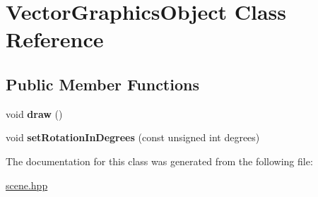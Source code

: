 \hypertarget{class_vector_graphics_object}{}\section{Vector\+Graphics\+Object Class Reference}
\label{class_vector_graphics_object}
\subsection*{Public Member Functions}
\begin{DoxyCompactItemize}
\item 
\mbox{\label{class_vector_graphics_object_a033a9ec046b5a77f478926ce210f9e99}} 
void {\bfseries draw} ()
\item 
\mbox{\label{class_vector_graphics_object_af86c080d8c81da38ea7c91f13211bab9}} 
void {\bfseries set\+Rotation\+In\+Degrees} (const unsigned int degrees)
\end{DoxyCompactItemize}


The documentation for this class was generated from the following file\+:\begin{DoxyCompactItemize}
\item 
\mbox{\hyperlink{scene_8hpp}{scene.\+hpp}}\end{DoxyCompactItemize}
